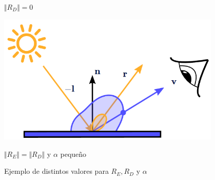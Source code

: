 \begin{figure}[!h]
\begin{minipage}[c]{0.45\linewidth}
        \caption{$\Vert R_D\Vert = 0$}
     \end{minipage}
     \begin{minipage}[c]{0.45\linewidth}
        \centering
        \includegraphics[width=0.95\textwidth]{Plantilla-TFG-master/img/ks1kd1a0.png}
        \caption{$\Vert R_E\Vert =\Vert R_D\Vert$ y $\alpha$ pequeño}
     \end{minipage}
     \caption{Ejemplo de distintos valores para $R_E,R_D$ y $\alpha$}
     \label{fig:parametrosEspecular}
\end{figure}

